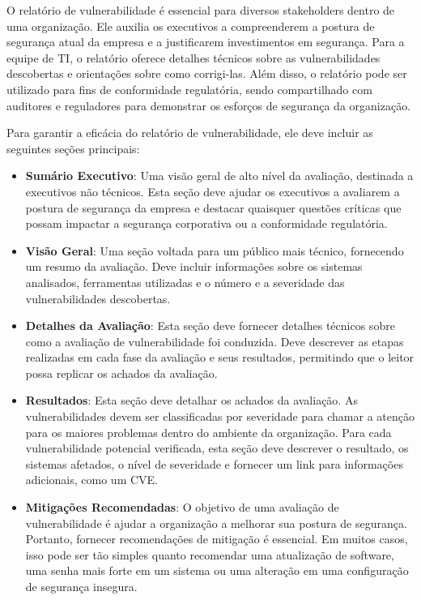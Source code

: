     O relatório de vulnerabilidade é essencial para diversos stakeholders dentro de uma organização. Ele auxilia os executivos a compreenderem a postura de segurança atual da empresa e a justificarem investimentos em segurança. Para a equipe de TI, o relatório oferece detalhes técnicos sobre as vulnerabilidades descobertas e orientações sobre como corrigi-las. Além disso, o relatório pode ser utilizado para fins de conformidade regulatória, sendo compartilhado com auditores e reguladores para demonstrar os esforços de segurança da organização.

    Para garantir a eficácia do relatório de vulnerabilidade, ele deve incluir as seguintes seções principais:

    \begin{itemize}
        \item \textbf{Sumário Executivo}: Uma visão geral de alto nível da avaliação, destinada a executivos não técnicos. Esta seção deve ajudar os executivos a avaliarem a postura de segurança da empresa e destacar quaisquer questões críticas que possam impactar a segurança corporativa ou a conformidade regulatória.
        \item \textbf{Visão Geral}: Uma seção voltada para um público mais técnico, fornecendo um resumo da avaliação. Deve incluir informações sobre os sistemas analisados, ferramentas utilizadas e o número e a severidade das vulnerabilidades descobertas.
        \item \textbf{Detalhes da Avaliação}: Esta seção deve fornecer detalhes técnicos sobre como a avaliação de vulnerabilidade foi conduzida. Deve descrever as etapas realizadas em cada fase da avaliação e seus resultados, permitindo que o leitor possa replicar os achados da avaliação.
        \item \textbf{Resultados}: Esta seção deve detalhar os achados da avaliação. As vulnerabilidades devem ser classificadas por severidade para chamar a atenção para os maiores problemas dentro do ambiente da organização. Para cada vulnerabilidade potencial verificada, esta seção deve descrever o resultado, os sistemas afetados, o nível de severidade e fornecer um link para informações adicionais, como um CVE.
        \item \textbf{Mitigações Recomendadas}: O objetivo de uma avaliação de vulnerabilidade é ajudar a organização a melhorar sua postura de segurança. Portanto, fornecer recomendações de mitigação é essencial. Em muitos casos, isso pode ser tão simples quanto recomendar uma atualização de software, uma senha mais forte em um sistema ou uma alteração em uma configuração de segurança insegura.
    \end{itemize}

